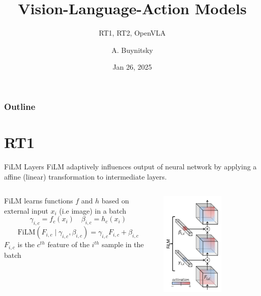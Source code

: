 \documentclass{beamer}
\title[RT1, RT2, OpenVLA]{Vision-Language-Action Models}
\subtitle{RT1, RT2, OpenVLA} %
\author[MLP]{A. Buynitsky}
\date{Jan 26, 2025}
\begin{document}
\frame{\titlepage}


\begin{frame}
\frametitle{Outline}
\tableofcontents
\end{frame}
\section{RT1}

\begin{frame}[t]{FiLM Layers}
    FiLM adaptively influences output of neural network by applying a affine (linear) transformation to intermediate layers. \newline
    \begin{columns}
        \hspace{1em}
		\begin{column}{.5\textwidth}
            FiLM learns functions $f$ and $h$  based on external input $x_i$ (i.e image) in a batch
            \small
                \[\gamma_{i,c} = f_c(x_i) \quad \beta_{i,c} = h_c(x_i)\]
                \[\text{FiLM}(F_{i,c} \mid \gamma_{i,c}, \beta_{i,c}) = \gamma_{i,c} F_{i,c} + \beta_{i,c}\]
            \normalsize
            $F_{i,c}$ is the $c^{th}$ feature of the $i^{th}$ sample in the batch
		\end{column}
        \hspace{0em}
		\begin{column}{.5\textwidth}
            \begin{center}
                \includegraphics[width=0.6\textwidth]{./img/film_comp.png}
            \end{center}
		\end{column}
	\end{columns}
\end{frame}
\end{document}
